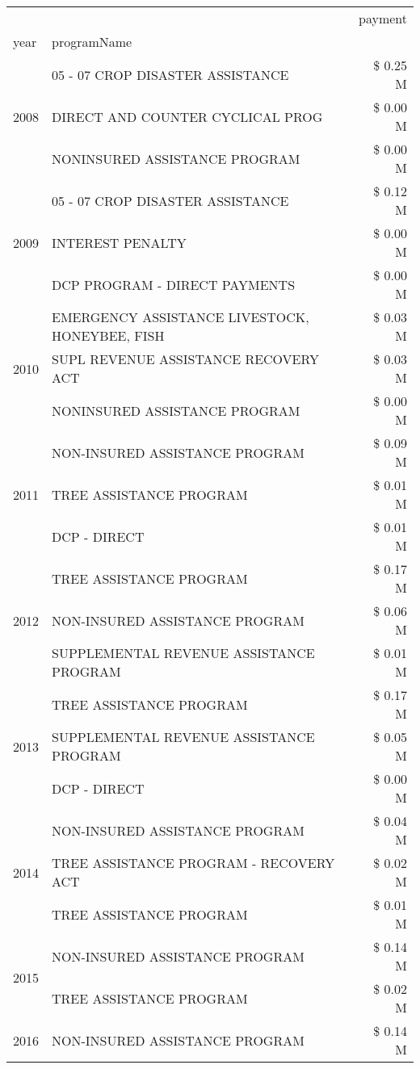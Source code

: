 \begin{tabular}{llr}
\toprule
 &  & payment \\
year & programName &  \\
\midrule
\multirow[t]{3}{*}{2008} & 05 - 07 CROP DISASTER ASSISTANCE & \$ 0.25 M \\
 & DIRECT AND COUNTER CYCLICAL PROG & \$ 0.00 M \\
 & NONINSURED ASSISTANCE PROGRAM & \$ 0.00 M \\
\cline{1-3}
\multirow[t]{3}{*}{2009} & 05 - 07 CROP DISASTER ASSISTANCE & \$ 0.12 M \\
 & INTEREST PENALTY & \$ 0.00 M \\
 & DCP PROGRAM - DIRECT PAYMENTS & \$ 0.00 M \\
\cline{1-3}
\multirow[t]{3}{*}{2010} & EMERGENCY ASSISTANCE LIVESTOCK, HONEYBEE, FISH & \$ 0.03 M \\
 & SUPL REVENUE ASSISTANCE RECOVERY ACT & \$ 0.03 M \\
 & NONINSURED ASSISTANCE PROGRAM & \$ 0.00 M \\
\cline{1-3}
\multirow[t]{3}{*}{2011} & NON-INSURED ASSISTANCE PROGRAM & \$ 0.09 M \\
 & TREE ASSISTANCE PROGRAM & \$ 0.01 M \\
 & DCP - DIRECT & \$ 0.01 M \\
\cline{1-3}
\multirow[t]{3}{*}{2012} & TREE ASSISTANCE PROGRAM & \$ 0.17 M \\
 & NON-INSURED ASSISTANCE PROGRAM & \$ 0.06 M \\
 & SUPPLEMENTAL REVENUE ASSISTANCE PROGRAM & \$ 0.01 M \\
\cline{1-3}
\multirow[t]{3}{*}{2013} & TREE ASSISTANCE PROGRAM & \$ 0.17 M \\
 & SUPPLEMENTAL REVENUE ASSISTANCE PROGRAM & \$ 0.05 M \\
 & DCP - DIRECT & \$ 0.00 M \\
\cline{1-3}
\multirow[t]{3}{*}{2014} & NON-INSURED ASSISTANCE PROGRAM & \$ 0.04 M \\
 & TREE ASSISTANCE PROGRAM - RECOVERY ACT & \$ 0.02 M \\
 & TREE ASSISTANCE PROGRAM & \$ 0.01 M \\
\cline{1-3}
\multirow[t]{2}{*}{2015} & NON-INSURED ASSISTANCE PROGRAM & \$ 0.14 M \\
 & TREE ASSISTANCE PROGRAM & \$ 0.02 M \\
\cline{1-3}
\multirow[t]{3}{*}{2016} & NON-INSURED ASSISTANCE PROGRAM & \$ 0.14 M \\

\end{tabular}
